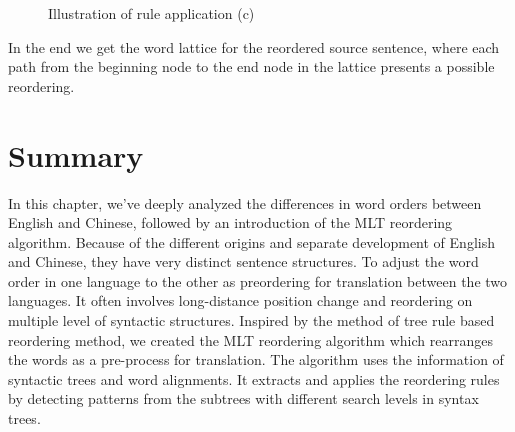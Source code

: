 \begin{figure}[H]
\centering
\subfigure{

}
\subfigure{

}
\caption{Illustration of rule application (c)}
\end{figure}

In the end we get the word lattice for the reordered source sentence, where each path from the beginning node to the end node in the lattice presents a possible reordering.

\section{Summary}
In this chapter, we've deeply analyzed the differences in word orders between English and Chinese, followed by an introduction of the \ac{MLT} reordering algorithm. Because of the different origins and separate development of English and Chinese, they have very distinct sentence structures. To adjust the word order in one language to the other as preordering for translation between the two languages. It often involves long-distance position change and reordering on multiple level of syntactic structures. Inspired by the method of tree rule based reordering method, we created the \ac{MLT} reordering algorithm which rearranges the words as a pre-process for translation. The algorithm uses the information of syntactic trees and word alignments. It extracts and applies the reordering rules by detecting patterns from the subtrees with different search levels in syntax trees.
